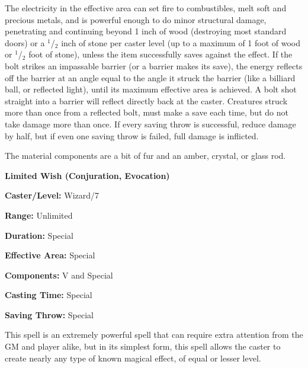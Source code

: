 \begin{multicols}{2}
The electricity in the effective area can set fire to combustibles, melt soft and precious metals, and is powerful enough to do minor structural damage, penetrating and continuing beyond 1 inch of wood (destroying most standard doors) or a $^1$/$_2$ inch of stone per caster level (up to a maximum of 1 foot of wood or $^1$/$_2$ foot of stone), unless the item successfully saves against the effect.  If the bolt strikes an impassable barrier (or a barrier makes its save), the energy reflects off the barrier at an angle equal to the angle it struck the barrier (like a billiard ball, or reflected light), until its maximum effective area is achieved.  A bolt shot straight into a barrier will reflect directly back at the caster.  Creatures struck more than once from a reflected bolt, must make a save each time, but do not take damage more than once.  If every saving throw is successful, reduce damage by half, but if even one saving throw is failed, full damage is inflicted.

The material components are a bit of fur and an amber, crystal, or glass rod.

\vspace{1em}

\noindent
\begin{minipage}{\columnwidth}

\noindent \textbf{Limited Wish (Conjuration, Evocation)}

\noindent \textbf{Caster/Level:} Wizard/7

\noindent \textbf{Range:} Unlimited

\noindent \textbf{Duration:} Special

\noindent \textbf{Effective Area:} Special

\noindent \textbf{Components:} V and Special

\noindent \textbf{Casting Time:} Special

\noindent \textbf{Saving Throw:} Special

\end{minipage}

This spell is an extremely powerful spell that can require extra attention from the GM and player alike, but in its simplest form, this spell allows the caster to create nearly any type of known magical effect, of equal or lesser level.


\end{multicols}
